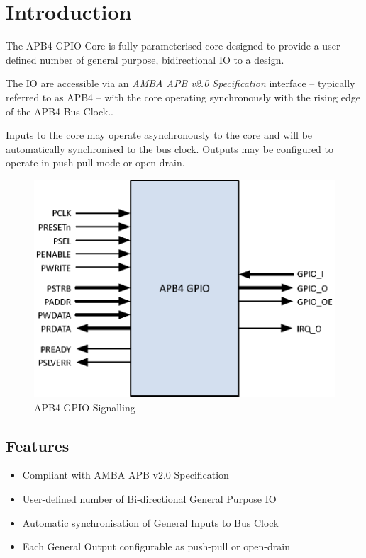 \chapter{Introduction} \label{introduction}

The APB4 GPIO Core is fully parameterised core designed to provide a
user-defined number of general purpose, bidirectional IO to a design.

The IO are accessible via an \emph{AMBA APB v2.0 Specification}
interface -- typically referred to as APB4 -- with the core operating
synchronously with the rising edge of the APB4 Bus Clock..

Inputs to the core may operate asynchronously to the core and will be
automatically synchronised to the bus clock. Outputs may be configured
to operate in push-pull mode or open-drain.

\begin{figure}[tbh]
	\centering
	\includegraphics{assets/img/apb4-gpio-sig}
	\caption{APB4 GPIO Signalling}
	\label{fig:apb4-gpio-sig}
\end{figure}

\section{Features}\label{features}

\begin{itemize}
\item
  Compliant with AMBA APB v2.0 Specification
\item
  User-defined number of Bi-directional General Purpose IO
\item
  Automatic synchronisation of General Inputs to Bus Clock
\item
  Each General Output configurable as push-pull or open-drain
\end{itemize}
